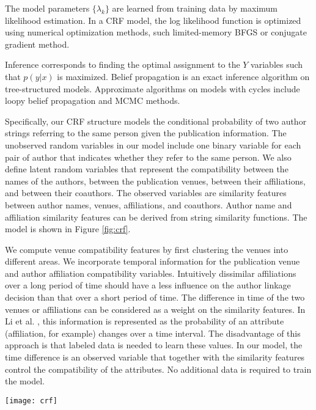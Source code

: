 \documentclass[twocolumn,letterpaper]{article}
\begin{document}
The model parameters $\{\lambda_k\}$ are learned from training data by
maximum likelihood estimation.  In a CRF model, the log likelihood
function is optimized using numerical optimization methods, such
limited-memory BFGS or conjugate gradient method.

Inference corresponds to finding the optimal assignment to the $Y$
variables such that $p(y|x)$ is maximized.  Belief propagation is an
exact inference algorithm on tree-structured models.  Approximate
algorithms on models with cycles include loopy belief propagation and
MCMC methods.



Specifically, our CRF structure models the conditional probability of
two author strings referring to the same person given the publication
information.  The unobserved random variables in our model include one
binary variable for each pair of author that indicates whether they
refer to the same person.  We also define latent random variables that
represent the compatibility between the names of the authors, between
the publication venues, between their affiliations, and between their
coauthors.  The observed variables are similarity features between
author names, venues, affiliations, and coauthors.  Author name and
affiliation similarity features can be derived from string similarity
functions.  The model is shown in Figure \ref{fig:crf}.

We compute venue compatibility features by first clustering the venues
into different areas.  We incorporate temporal information for the
publication venue and author affiliation compatibility variables.
Intuitively dissimilar affiliations over a long period of time should
have a less influence on the author linkage decision than that over a
short period of time.  The difference in time of the two venues or
affiliations can be considered as a weight on the similarity features.
In Li et al. \cite{DBLP:journals/fcsc/LiDMS12}, this information is
represented as the probability of an attribute (affiliation, for
example) changes over a time interval.  The disadvantage of this
approach is that labeled data is needed to learn these values.  In our
model, the time difference is an observed variable that together with
the similarity features control the compatibility of the attributes.
No additional data is required to train the model.

\begin{figure*}
\centering
\texttt{[image: crf]}
\caption{Our CRF model for the author linkage problem.  $A_i$ denotes
  the $i$th author string.  $A_i.n$, $A_i.v$, $A_i.aff$, and $A_i.ca$
  denote the name, venue, affiliation, and coauthors of $A_i$.  The
  oval nodes are unobserved random variables, and the box-shaped ones
  are observed variables.}
\label{fig:crf}
\end{figure*}
\end{document}
